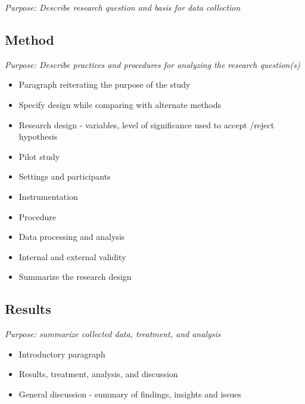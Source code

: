 \emph{Purpose: Describe research question and basis for data collection}

\subsection{Method}
\label{method}

\emph{Purpose: Describe practices and procedures for analyzing the research question(s)}

\begin{itemize}
\item Paragraph reiterating the purpose of the study

\item Specify design while comparing with alternate methods

\item Research design - variables, level of significance used to accept \slash  reject hypothesis

\item Pilot study

\item Settings and participants

\item Instrumentation

\item Procedure

\item Data processing and analysis

\item Internal and external validity

\item Summarize the research design

\end{itemize}

\subsection{Results}
\label{results}

\emph{Purpose: summarize collected data, treatment, and analysis}

\begin{itemize}
\item Introductory paragraph

\item Results, treatment, analysis, and discussion

\item General discussion - summary of findings, insights and issues

\end{itemize}

